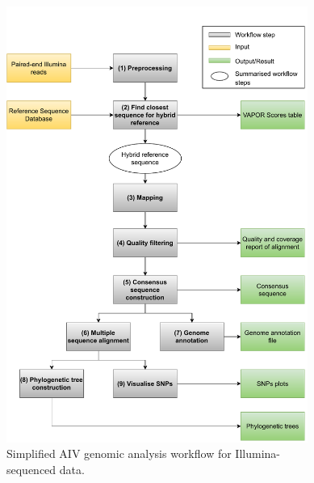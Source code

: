 \begin{figure}[ht!]
	\includegraphics[width=0.88\textwidth]{media/3-aiv.pdf}
	\caption{Simplified \ac{AIV} genomic analysis workflow for Illumina-\\sequenced data.}
	\label{fig:3-aiv-wf}
\end{figure}

